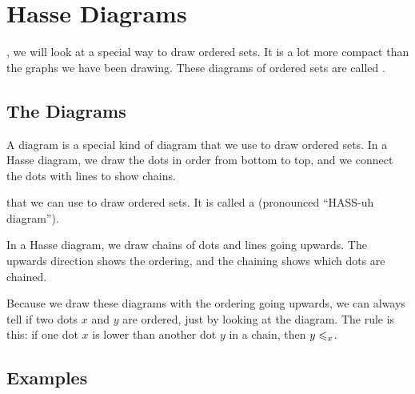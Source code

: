 \documentclass[../../../main.tex]{subfiles}
\begin{document}
\chapter{Hasse Diagrams}
\label{ch:hasse-diagrams}

, we will look at a special way to draw ordered sets. It is a lot more compact than the graphs we have been drawing. These diagrams of ordered sets are called .


\section{The Diagrams}

\begin{terminology}
  A  diagram is a special kind of diagram that we use to draw ordered sets. In a Hasse diagram, we draw the dots in order from bottom to top, and we connect the dots with lines to show chains.
\end{terminology}

 that we can use to draw ordered sets. It is called a  (pronounced ``HASS-uh diagram''). 

In a Hasse diagram, we draw chains of dots and lines going upwards. The upwards direction shows the ordering, and the chaining shows which dots are chained.

Because we draw these diagrams with the ordering going upwards, we can always tell if two dots $x$ and $y$ are ordered, just by looking at the diagram. The rule is this: if one dot $x$ is lower than another dot $y$ in a chain, then $\ordered{x}{y}$.


\section{Examples}
\end{document}
